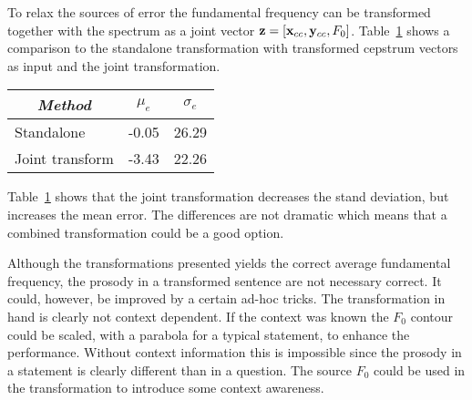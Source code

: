 To relax the sources of error the fundamental frequency can be transformed together with the spectrum as a joint vector $\mathbf{z} = \left[\mathbf{x}_{cc},\mathbf{y}_{cc},F_0\right]$. Table~\ref{tab:f0_joint_transform} shows a comparison to the standalone transformation with transformed cepstrum vectors as input and the joint transformation.
\begin{table}[htbp]
	\begin{center}
		\label{tab:f0_joint_transform}
		\begin{tabular}{lll}
			\toprule
			\multicolumn{1}{c}{\emph{Method}} & \multicolumn{1}{c}{\emph{$\mu_e$}} & \multicolumn{1}{c}{\emph{$\sigma_e$}}\\
			\midrule
			Standalone & -0.05 & 26.29 \\
			Joint transform & -3.43 & 22.26 \\
			\bottomrule			
		\end{tabular}		
	\end{center}	
\end{table}
Table~\ref{tab:f0_joint_transform} shows that the joint transformation decreases the stand deviation, but increases the mean error. The differences are not dramatic which means that a combined transformation could be a good option.

Although the transformations presented yields the correct average fundamental frequency, the prosody in a transformed sentence are not necessary correct. It could, however, be improved by a certain ad-hoc tricks. The transformation in hand is clearly not context dependent. If the context was known the $F_0$ contour could be scaled, with \eg a parabola for a typical statement, to enhance the performance. Without context information this is impossible since the prosody in a statement is clearly different than in a question. The source $F_0$ could be used in the transformation to introduce some context awareness. 

